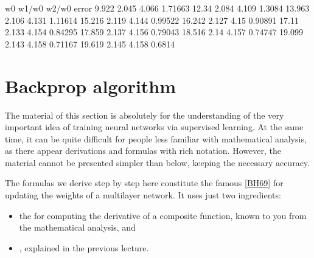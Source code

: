 \documentclass[letterpaper,10pt,english]{jupyterBook}
\begin{document}
\begin{sphinxVerbatim}[commandchars=\\\{\}]
   w0   w1/w0  w2/w0 error
\PYGZhy{}9.922 2.045 \PYGZhy{}4.066 1.71663
\PYGZhy{}12.34 2.084 \PYGZhy{}4.109 1.3084
\PYGZhy{}13.963 2.106 \PYGZhy{}4.131 1.11614
\PYGZhy{}15.216 2.119 \PYGZhy{}4.144 0.99522
\PYGZhy{}16.242 2.127 \PYGZhy{}4.15 0.90891
\PYGZhy{}17.11 2.133 \PYGZhy{}4.154 0.84295
\PYGZhy{}17.859 2.137 \PYGZhy{}4.156 0.79043
\PYGZhy{}18.516 2.14 \PYGZhy{}4.157 0.74747
\PYGZhy{}19.099 2.143 \PYGZhy{}4.158 0.71167
\PYGZhy{}19.619 2.145 \PYGZhy{}4.158 0.6814
\end{sphinxVerbatim}


\section{Backprop algorithm}
\label{\detokenize{docs/backprop:backprop-algorithm}}\label{\detokenize{docs/backprop:bpa-lab}}
\sphinxAtStartPar
The material of this section is absolutely  for the understanding of the very important idea of training neural networks via supervised learning. At the same time, it can be quite difficult for people less familiar with mathematical analysis, as there appear derivations and formulas with rich notation. However, the material cannot be presented simpler than below, keeping the necessary accuracy.

\sphinxAtStartPar
The formulas we derive step by step here constitute the famous  {[}\hyperlink{cite.docs/conclusion:id12}{BH69}{]} for updating the weights of a multi\sphinxhyphen{}layer network. It uses just two ingredients:
\begin{itemize}
\item {} 
\sphinxAtStartPar
the  for computing the derivative of a composite function, known to you from the mathematical analysis, and

\item {} 
\sphinxAtStartPar
{}, explained in the previous lecture.

\end{itemize}
\end{document}
